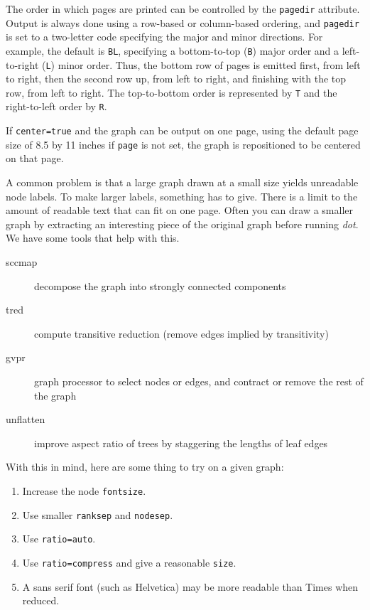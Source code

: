 \documentclass[11pt]{article}
\def\dot{{\it dot}}
\begin{document}
{The order in which pages are printed can be controlled by the
{\tt pagedir} attribute. Output is always done using a row-based or
column-based ordering,
and {\tt pagedir} is set to a two-letter code specifying the major
and minor directions. For example, the default is {\tt BL}, specifying
a bottom-to-top ({\tt B}) major order and a left-to-right ({\tt L}) 
minor order. Thus,
the bottom row of pages is emitted first, from left to right, then the
second row up, from left to right, and finishing with the top row,
from left to right. The top-to-bottom order is represented by {\tt T}
and the right-to-left order by {\tt R}.

If {\tt center=true} and the graph can be output on one page, using the
default page size of 8.5 by 11 inches if {\tt page} is not set, the
graph is repositioned to be centered on that page.

A common problem is that a large graph drawn at a small size
yields unreadable node labels.
To make larger labels, something has to give.
There is a limit to the amount of readable text that can fit on one page.
Often you can draw a smaller graph by extracting an interesting
piece of the original graph before running \dot.
We have some tools that help with this.
\begin{description}
\item [sccmap] decompose the graph into strongly connected components
\item [tred] compute transitive reduction (remove edges implied by transitivity)
\item [gvpr] graph processor to select nodes or edges, and contract 
or remove the rest of the graph
\item [unflatten] improve aspect ratio of trees by staggering the lengths 
of leaf edges
\end{description}

With this in mind, here are some thing to try on a given graph:
\begin{enumerate}
\item Increase the node \verb"fontsize".
\item Use smaller \verb"ranksep" and \verb"nodesep".
\item Use \verb"ratio=auto".
\item Use \verb"ratio=compress" and give a reasonable \verb"size".
\item A sans serif font (such as Helvetica) may be more readable than Times
when reduced.
\end{enumerate}

}
\end{document}
